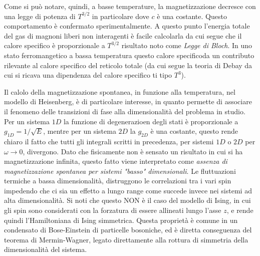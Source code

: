 Come si pu\`o notare, quindi, a basse temperature, la magnetizzazione decresce con una legge di potenza di $T^{3/2}$ in particolare
dove $c$ \`e una costante. Questo comportamento \`e confermato sperimentalmente. A questo punto l'energia totale del gas di magnoni liberi non interagenti \`e facile calcolarla
da cui segue che il calore specifico \`e proporzionale a $T^{3/2}$ risultato noto come \textit{Legge di Bloch}. In uno stato ferromangetico a bassa temperatura questo calore specificoda un contributo rilevante al calore specifico del reticolo totale (da cui segue la teoria di Debay da cui si ricava una dipendenza del calore specifico ti tipo $T^3$). 

Il calolo della magnetizzazione spontanea, in funzione alla temperatura, nel modello di Heisenberg, \`e di particolare interesse, in quanto permette di associare il fenomeno delle transizioni di fase alla dimensionalit\`a del problema in studio. Per un sistema $1D$ la funzione di degenerazioen degli stati \`e proporzionale a $g_{1D} = 1/\sqrt{E}$, mentre per un sistema $2D$ la $g_{2D}$ \`e una costante, questo rende chiaro il fatto che tutti gli integrali scritti in precedenza, per sistemi $1D$ o $2D$ per $\omega\to0$, divergono. Dato che fisicamente non \`e sensato un risultato in cui si ha magnetizzazione infinita, questo fatto viene interpretato come \textit{assenza di magnetizzazione spontanea per sistemi "basso" dimensionali}. Le fluttuazioni termiche a bassa dimensionalit\`a, distruggono le correlazioni tra i vari spin impedendo che ci sia un effetto a lungo range come succede invece nei sistemi ad alta dimensionalit\`a. Si noti che questo NON \`e il caso del modello di Ising, in cui gli spin sono considerati con la forzatura di essere allineati lungo l'asse $z$, e rende quindi l'Hamiltoniana di Ising simmetrica. Questa propriet\`a  \`e comune in un condensato di Bose-Einstein di particelle bosoniche, ed \`e diretta conseguenza del teorema di Mermin-Wagner, legato direttamente alla rottura di simmetria della dimensionalit\`a del sistema.

